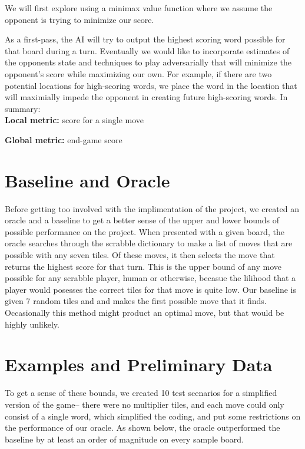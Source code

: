 \documentclass[12pt]{article}
\begin{document}
We will first explore using a minimax value function where we assume
the opponent is trying to minimize our score.

As a first-pass, the AI will try to output the highest scoring word
possible for that board during a turn.  Eventually we would like to
incorporate estimates of the opponents state and techniques to play
adversarially that will minimize the opponent's score while maximizing
our own. For example, if there are two potential locations for
high-scoring words, we place the word in the location that will
maximially impede the opponent in creating future high-scoring
words. In summary:\\

\textbf{Local metric:} score for a single move

\textbf{Global metric:} end-game score

\section*{Baseline and Oracle}
	Before getting too involved with the implimentation of the project, we created an oracle and a baseline to get a better sense of the upper and lower bounds of possible performance on the project. When presented with a given board, the oracle searches through the scrabble dictionary to make a list of moves that are possible with any seven tiles. Of these moves, it then selects the move that returns the highest score for that turn. This is the upper bound of any move possible for any scrabble player, human or otherwise, becasue the lilihood that a player would posesses the correct tiles for that move is quite low. Our baseline is given 7 random tiles and and makes the first possible move that it finds. Occasionally this method might product an optimal move, but that would be highly unlikely.  

\section*{Examples and Preliminary Data}

To get a sense of these bounds, we created 10 test scenarios for a simplified version of the game-- there were no multiplier tiles, and each move could only consist of a single word, which simplified the coding, and put some restrictions on the performance of our oracle. As shown below, the oracle outperformed the baseline by at least an order of magnitude on every sample board. 
\end{document}
